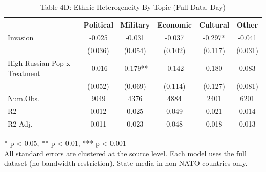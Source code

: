 \begin{table}[!t]
\caption{Table 4D: Ethnic Heterogeneity By Topic (Full Data, Day)} 
\fontsize{12.0pt}{14.4pt}\selectfont
\begin{tabular*}{\linewidth}{@{\extracolsep{\fill}}lccccc}
\toprule
  & Political & Military & Economic & Cultural & Other \\ 
\midrule\addlinespace[2.5pt]
Invasion & -0.025 & -0.031 & -0.037 & -0.297* & -0.041 \\ 
 & (0.036) & (0.054) & (0.102) & (0.117) & (0.031) \\ 
High Russian Pop x Treatment & -0.016 & -0.179** & -0.142 & 0.180 & 0.083 \\ 
{} & {(0.052)} & {(0.069)} & {(0.114)} & {(0.127)} & {(0.081)} \\ 
Num.Obs. & 9049 & 4376 & 4884 & 2401 & 6201 \\ 
R2 & 0.012 & 0.025 & 0.049 & 0.021 & 0.014 \\ 
R2 Adj. & 0.011 & 0.023 & 0.048 & 0.018 & 0.013 \\ 
\bottomrule
\end{tabular*}
\begin{minipage}{\linewidth}
* p < 0.05, ** p < 0.01, *** p < 0.001\\
All standard errors are clustered at the source level. Each model uses the full
dataset (no bandwidth restriction). State media in non-NATO countries only.\\
\end{minipage}
\end{table}

